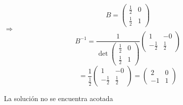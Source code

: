 $$B=\begin{pmatrix}\frac{1}{2}&0\\ \frac{1}{2}&1\end{pmatrix}$$
$\Rightarrow$
$$B^{-1}=\frac{1}{\det \begin{pmatrix}\frac{1}{2}&0\\ \frac{1}{2}&1\end{pmatrix}}\begin{pmatrix}1&-0\\ -\frac{1}{2}&\frac{1}{2}\end{pmatrix}$$
$$=\frac{1}{\frac{1}{2}}\begin{pmatrix}1&-0\\ -\frac{1}{2}&\frac{1}{2}\end{pmatrix}=\begin{pmatrix}2&0\\ -1&1\end{pmatrix}$$

La solución no se encuentra acotada